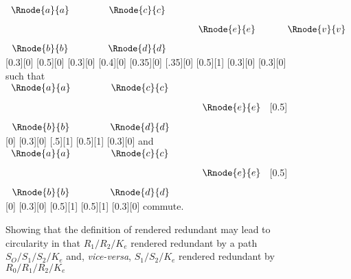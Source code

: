 \begin{figure} [h]  %
\begin{center}
$
\begin{array}{c p{0.75cm}c p{0.5cm}c p{0.5cm}c}
 \Rnode{a}{a}  && \Rnode{c}{c}  &&              &&              \\ [0.3cm]
	 	           &&               && \Rnode{e}{e} && \Rnode{v}{v} \\ [0.3cm]     
 \Rnode{b}{b}  && \Rnode{d}{d}  &&              &&              \\ 
\end{array}
$
[0.3][0]
\idcomp
{} 
[0.5][0]
[0.3][0]
\idcomp
{}
[0.4][0]
\idcomp
{}
[0.35][0]
[.35][0]
[0.5][1]
[0.3][0]
\idcomp
{}
[0.3][0]
\idcomp
\vspace{1.5cm}
\newline
such that \hspace{0.5cm}
$
\begin{array}{c p{0.75cm}c p{0.5cm}c}
 \Rnode{a}{a}  && \Rnode{c}{c}  &&              \\ [0.3cm]
	 	           &&               && \Rnode{e}{e}  \\ [0.3cm]     
 \Rnode{b}{b}  && \Rnode{d}{d}  &&              \\ 
\end{array}
$
[0.5][0]
[0.3][0]
\idcomp
{}
[.5][1]
[0.5][1]
[0.3][0]
\idcomp
\hspace {0.25cm} and \hspace{0.5cm}
$
\begin{array}{c p{0.75cm}c p{0.5cm}c}
 \Rnode{a}{a}  && \Rnode{c}{c}  &&              \\ [0.3cm]
	 	           &&               && \Rnode{e}{e}  \\ [0.3cm]     
 \Rnode{b}{b}  && \Rnode{d}{d}  &&               \\ 
\end{array}
$
[0.5][0]
[0.3][0]
\idcomp
{}
[0.5][1]
[0.5][1]
[0.3][0]
\idcomp
\hspace{0.2cm} commute.

\end{center}
\caption{Showing that the definition of rendered redundant may lead to circularity in that
$R_1/R_2/K_e$  rendered redundant by a path $S_O/S_1/S_2/K_e$  and, \textit{vice-versa}, 
$S_1/S_2/K_e$ rendered redundant by $R_0/R_1/R_2/K_e$}
\label{redundancyproblemshape}
\end{figure}

